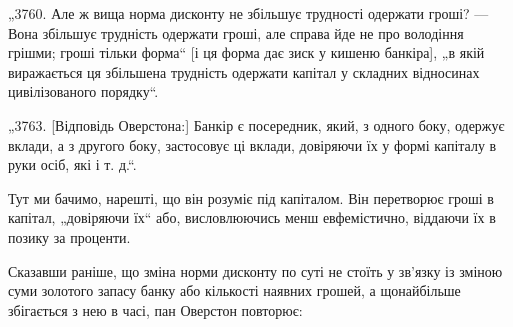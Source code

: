 „3760. Але ж вища норма дисконту не збільшує трудності
одержати гроші? — Вона збільшує трудність одержати гроші, але
справа йде не про володіння грішми; гроші тільки форма“ [і ця
форма дає зиск у кишеню банкіра], „в якій виражається ця збільшена трудність одержати капітал у
складних відносинах цивілізованого порядку“.

„3763. [Відповідь Оверстона:] Банкір є посередник, який,
з одного боку, одержує вклади, а з другого боку, застосовує
ці вклади, довіряючи їх у формі капіталу в руки осіб, які
і т. д.“.

Тут ми бачимо, нарешті, що він розуміє під капіталом. Він
перетворює гроші в капітал, „довіряючи їх“ або, висловлюючись
менш евфемістично, віддаючи їх в позику за проценти.

Сказавши раніше, що зміна норми дисконту по суті не стоїть
у зв’язку із зміною суми золотого запасу банку або кількості
наявних грошей, а щонайбільше збігається з нею в часі, пан
Оверстон повторює:
